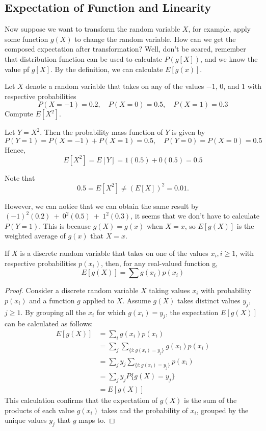 \subsection{Expectation of Function and Linearity}
Now suppose we want to transform the random variable $X$, for example, apply some function $g(X)$ to change the random variable.
How can we get the composed expectation after transformation? Well, don't be scared, remember that distribution function can be used to calculate $P(g[X])$, and we know the value pf $g[X]$. By the definition, we can calculate $E[g(x)]$.

\begin{example}
    Let $X$ denote a random variable that takes on any of the values $-1$, $0$, and $1$ with respective probabilities
\[
P(X = -1) = 0.2, \quad P(X = 0) = 0.5, \quad P(X = 1) = 0.3
\]
Compute $E[X^2]$.
\begin{solution}
    Let $Y = X^2$. Then the probability mass function of $Y$ is given by
\[
P(Y = 1) = P(X = -1) + P(X = 1) = 0.5, \quad P(Y = 0) = P(X = 0) = 0.5
\]
Hence,
\[
E[X^2] = E[Y] = 1(0.5) + 0(0.5) = 0.5
\]
\begin{remark}
Note that
\[
0.5 = E[X^2] \neq (E[X])^2 = 0.01.
\]
\end{remark}

\end{solution}
\end{example}

However, we can notice that  we can obtain the same result by 
$(-1)^{2}(0.2)\:+\:0^{2}(0.5)\:+\:1^{2}(0.3)$, it seems that we don't have to calculate $P(Y=1)$. This is because $g(X) = g(x)$ when $X = x$, so $E[g(X)]$ is the weighted average of $g(x)$ that $X=x$.
\begin{proposition}
    If $X$ is a discrete random variable that takes on one of the values $x_i,i\geq1$, with
respective probabilities $p(x_i)$, then, for any real-valued function g,
$$E[g(X)]=\sum g(x_i)p(x_i)$$
\end{proposition}
\begin{proof}
Consider a discrete random variable \(X\) taking values \(x_i\) with probability \(p(x_i)\) and a function \(g\) applied to \(X\). Assume \(g(X)\) takes distinct values \(y_j\), \(j \geq 1\). By grouping all the \(x_i\) for which \(g(x_i) = y_j\), the expectation \(E[g(X)]\) can be calculated as follows:
\begin{align*}
E[g(X)] &= \sum_i g(x_i)p(x_i) \\
&= \sum_j \sum_{\{i : g(x_i) = y_j\}} g(x_i)p(x_i) \\
&= \sum_j y_j \sum_{\{i : g(x_i) = y_j\}} p(x_i) \\
&= \sum_j y_j P\{g(X) = y_j\} \\
&= E[g(X)]
\end{align*}
This calculation confirms that the expectation of \(g(X)\) is the sum of the products of each value \(g(x_i)\) takes and the probability of \(x_i\), grouped by the unique values \(y_j\) that \(g\) maps to.
\end{proof}

